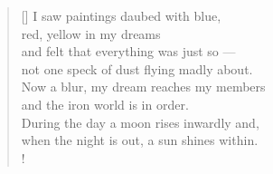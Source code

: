 \documentclass[a4paper,12pt,twoside,final]{book}
\begin{document}
\newpage


\settowidth{\versewidth}{Now a blur, my dream reaches my members}

\begin{verse}[\versewidth]
  I saw paintings daubed with blue, \\
  red, yellow in my dreams \\
  and felt that everything was just so ---\\
  not one speck of dust flying madly about. \\
  Now a blur, my dream reaches my members \\
  and the iron world is in order. \\
  During the day a moon rises inwardly and, \\
  when the night is out, a sun shines within. \\!
\end{verse}


\newpage

\settowidth{\versewidth}{Nappal hold kél bennem s ha kinn van}
\end{document}
